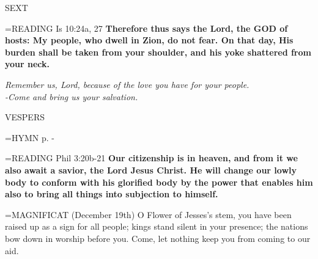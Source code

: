 \begin{flushleft}\normalsize SEXT\\\end{flushleft}

\hangindent=\parindent \small{\uppercase{READING}} Is 10:24a, 27 \textbf{Therefore thus says the Lord, the GOD of hosts: My people, who dwell in Zion, do not fear. On that day, His burden shall be taken from your shoulder, and his yoke shattered from your neck.\\}

\begin{center}
\textit{Remember us, Lord, because of the love you have for your people.\\
-Come and bring us your salvation.}
\end{center}

\begin{flushleft}\normalsize VESPERS\\\end{flushleft}

\hangindent=\parindent \small{\uppercase{HYMN} p. \pageref{advent:firstHymn}-\pageref{advent:lastHymn}\\}

\hangindent=\parindent \small{\uppercase{READING}} Phil 3:20b-21 \textbf{Our citizenship is in heaven, and from it we also await a savior, the Lord Jesus Christ. He will change our lowly body to conform with his glorified body by the power that enables him also to bring all things into subjection to himself.\\}

\hangindent=\parindent \small{MAGNIFICAT  (December 19th) O Flower of Jesses's stem, you have been raised up as a sign for all people; kings stand silent in your presence; the nations bow down in worship before you. Come, let nothing keep you from coming to our aid.\\}
